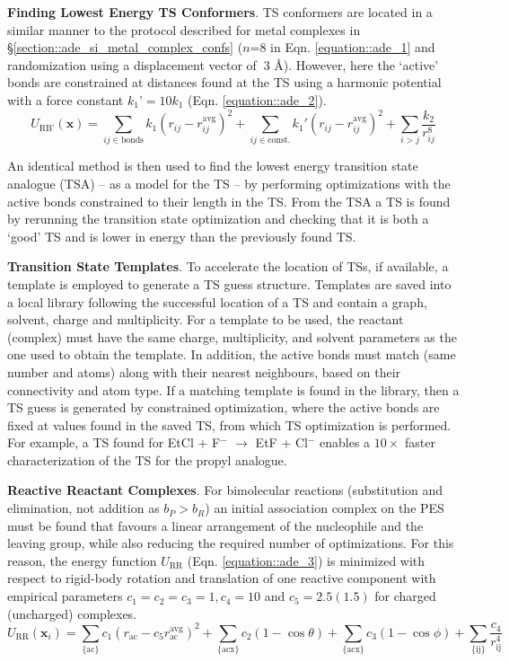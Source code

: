 \documentclass[../../main.tex]{subfiles}
\begin{document}
{\textbf{Finding Lowest Energy TS Conformers}}. TS conformers are located in a similar manner to the protocol described for metal complexes in §\ref{section::ade_si_metal_complex_confs} ($n$=8 in Eqn. \eqref{equation::ade_1} and randomization using a displacement vector of $~ 3$ \AA). However, here the ‘active’ bonds are constrained at distances found at the TS using a harmonic potential with a force constant $k_1’ = 10k_1$ (Eqn. \eqref{equation::ade_2}).
\begin{equation}
	U_\text{RB'}(\boldsymbol{x}) = \sum_{ij \in \text{bonds}} k_1 (r_{ij} - r_{ij}^\text{avg})^2 + \sum_{ij \in \text{const.}} k_1' (r_{ij} - r_{ij}^\text{avg})^2 + \sum_{i > j} \frac{k_2}{r_{ij}^8}
	\label{equation::ade_2}
\end{equation}

An identical method is then used to find the lowest energy transition state analogue (TSA) -- as a model for the TS -- by performing optimizations with the active bonds constrained to their length in the TS. From the TSA a TS is found by rerunning the transition state optimization and checking that it is both a ‘good’ TS and is lower in energy than the previously found TS.


{\bfseries{Transition State Templates}}. To accelerate the location of TSs, if available, a template is employed to generate a TS guess structure. Templates are saved into a local library following the successful location of a TS and contain a graph, solvent, charge and multiplicity. For a template to be used, the reactant (complex) must have the same charge, multiplicity, and solvent parameters as the one used to obtain the template. In addition, the active bonds must match (same number and atoms) along with their nearest neighbours, based on their connectivity and atom type. If a matching template is found in the library, then a TS guess is generated by constrained optimization, where the active bonds are fixed at values found in the saved TS, from which TS optimization is performed. For example, a TS found for EtCl + F$^{-}$ $\rightarrow$ EtF + Cl$^{-}$ enables a $10\times$ faster characterization of the TS for the propyl analogue. 


{\bfseries{Reactive Reactant Complexes}}. For bimolecular reactions (substitution and elimination, not addition as $b_P > b_R$) an initial association complex on the PES must be found that favours a linear arrangement of the nucleophile and the leaving group, while also reducing the required number of optimizations. For this reason, the energy function $U_\text{RR}$ (Eqn. \eqref{equation::ade_3}) is minimized with respect to rigid-body rotation and translation of one reactive component with empirical parameters $c_1 = c_2 = c_3 = 1, c_4 = 10$ and $c_5 = 2.5 (1.5)$ for charged (uncharged) complexes. 
\begin{equation}
	U_\text{RR}(\boldsymbol{x}_i) = \sum_\text{\{ac\}} c_1 (r_\text{ac} - c_5 r_\text{ac}^\text{avg})^2 + \sum_\text{\{acx\}} c_2 (1 - \cos\theta) + \sum_\text{\{acx\}} c_3 (1 - \cos\phi) + \sum_\text{\{ij\}} \frac{c_4}{r_\text{ij}^4}
	\label{equation::ade_3}
\end{equation}
\end{document}
